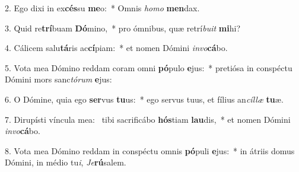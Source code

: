 2. Ego dixi in ex\textbf{cés}su \textbf{me}o:~*  Omnis \textit{ho}\textit{mo} \textbf{men}dax.\

3. Quid re\textbf{trí}buam \textbf{Dó}mino,~*  pro ómnibus, quæ retrí\textit{bu}\textit{it} \textbf{mi}hi?\

4. Cálicem salu\textbf{tá}ris ac\textbf{cí}piam:~*  et nomen Dómini \textit{in}\textit{vo}\textbf{cá}bo.\

5. Vota mea Dómino reddam coram omni \textbf{pó}pulo \textbf{e}jus:~*  pretiósa in conspéctu Dómini mors sanc\textit{tó}\textit{rum} \textbf{e}jus:\

6. O Dómine, quia ego \textbf{ser}vus \textbf{tu}us:~*  ego servus tuus, et fílius an\textit{cíl}\textit{læ} \textbf{tu}æ.\

7. Dirupísti víncula mea: \dag\  tibi sacrificábo \textbf{hós}tiam \textbf{lau}dis,~*  et nomen Dómini \textit{in}\textit{vo}\textbf{cá}bo.\

8. Vota mea Dómino reddam in conspéctu omnis \textbf{pó}puli \textbf{e}jus:~*  in átriis domus Dómini, in médio tu\textit{i}, \textit{Je}\textbf{rú}salem.\

